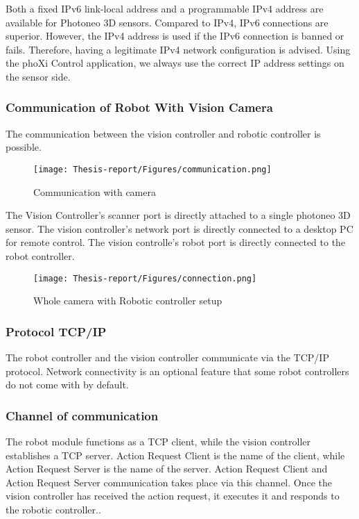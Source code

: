 \documentclass[12pt]{article}
\begin{document}
Both a fixed IPv6 link-local address and a programmable IPv4 address are available for Photoneo 3D sensors. Compared to IPv4, IPv6 connections are superior.  However, the IPv4 address is used if the IPv6 connection is banned or fails.   Therefore, having a legitimate IPv4 network configuration is advised.  Using the phoXi Control application, we always use the correct IP address settings on the sensor side\cite{ref2}.\\

\subsubsection{Communication of Robot With Vision Camera}
The communication between the vision controller and robotic controller is possible\cite{ref2}.\\
\begin{figure}[h]
    \centering
    \texttt{[image: Thesis-report/Figures/communication.png]}
    \caption{Communication with camera \cite{ref2}}
    \label{fig:camera-comms}
\end{figure}

The Vision Controller's scanner port is directly attached to a single photoneo 3D sensor. 
The vision controller's network port is directly connected to a desktop PC for remote control.
The vision controlle's robot port is directly connected to the robot controller\cite{ref2}.

\begin{figure}[h]
    \centering
    \texttt{[image: Thesis-report/Figures/connection.png]}
    \caption{Whole camera with Robotic controller setup\cite{ref2}}
    \label{fig:whole-camera}
\end{figure}

\newpage
 \subsubsection{Protocol TCP/IP}
The robot controller and the vision controller communicate via the TCP/IP protocol. Network connectivity is an optional feature that some robot controllers do not come with by default\cite{ref2}.

\subsubsection{Channel of communication}
The robot module functions as a TCP client, while the vision controller establishes a TCP server. Action Request Client is the name of the client, while Action Request Server is the name of the server.   Action Request Client and Action Request Server communication takes place via this channel.  Once the vision controller has received the action request, it executes it and responds to the robotic controller.\cite{ref2}.
\end{document}
